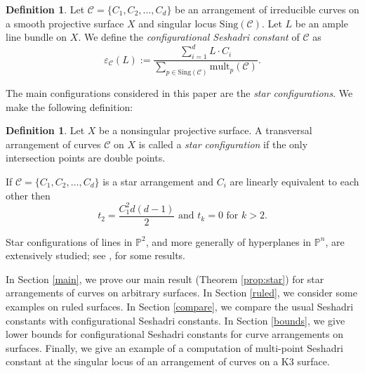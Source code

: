 \documentclass[12pt,reqno]{amsart}
\theoremstyle{plain}
\numberwithin{equation}{section}
\theoremstyle{definition}
\newtheorem{definition}[theorem]{Definition}
\begin{document}
	\begin{definition}
		Let $\mathcal{C}=\{C_1,C_2, \ldots ,C_d\}$ be an arrangement of irreducible curves
		on a smooth projective surface $X$ and singular locus $\text{Sing}(\mathcal{C}).$ Let $L$ be an ample line bundle on $X$. We define the \textit{configurational Seshadri constant} of $\mathcal{C}$ as 
			$$\varepsilon_\mathcal{C}(L):= \frac{\sum\limits_{i=1}^{d}L\cdot C_i}{\sum\limits_{p \in \text{Sing}(\mathcal{C}) }\text{mult}_p(\mathcal{C})}.$$
	\end{definition}	
	

The main configurations considered in this paper are the \textit{star configurations}. We make the following definition: 
\begin{definition} Let $X$ be a nonsingular projective surface.  
A transversal arrangement of curves $\mathcal{C}$ on $X$
		 is called a \emph{star  configuration} if the only intersection points are double points.
	\end{definition}
	
If $\mathcal{C}= \{C_1,C_2, \ldots ,C_d\}$ is a star arrangement and $C_i$ are linearly equivalent to each other then $$t_2=\frac{C_1^2d(d-1)}{2}\text{ and }t_k = 0 \text{ for } k > 2.$$ 

Star configurations of lines in $\mathbb{P}^2$, and more generally of hyperplanes in $\mathbb{P}^n$, are extensively studied; 
see \cite{CV,GHM, JP}, for some results. 	
	
In Section \ref{main}, we prove our main result (Theorem \ref{prop:star}) for star arrangements of curves on arbitrary surfaces. 
In Section \ref{ruled}, we consider some examples on ruled surfaces. In Section \ref{compare}, we compare the usual Seshadri constants with configurational Seshadri constants. In Section \ref{bounds}, we give lower bounds for configurational Seshadri constants for curve arrangements on surfaces. 
Finally, we give an example of a computation of multi-point Seshadri constant at the singular locus of an arrangement of curves on a K3 surface. 
	
\end{document}
